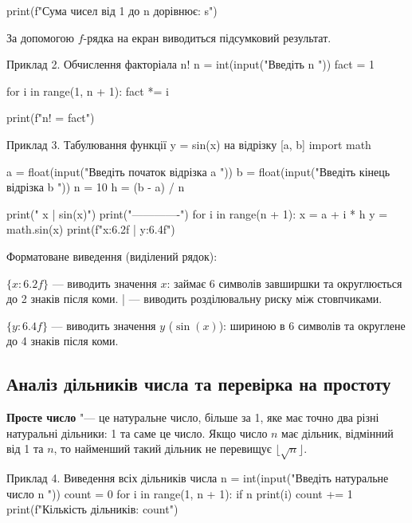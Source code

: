 print(f"Сума чисел від 1 до {n} дорівнює: {s}")

За допомогою $f$-рядка на екран виводиться підсумковий результат.
\begin{py}{Приклад 2. Обчислення факторіала n!}
n = int(input("Введіть n "))
fact = 1

for i in range(1, n + 1):
    fact *= i

print(f"{n}! = {fact}")
\end{py}

\begin{py}{Приклад 3. Табулювання функції y = sin(x) на відрізку [a, b]}
import math

a = float(input("Введіть початок відрізка a "))
b = float(input("Введіть кінець відрізка b "))
n = 10
h = (b - a) / n

print(" x | sin(x)")
print("-------------")
for i in range(n + 1):
    x = a + i * h
    y = math.sin(x)
    print(f"{x:6.2f} | {y:6.4f}")
\end{py}


Форматоване виведення (виділений рядок):

$\{x:6.2f\}$ — виводить значення $x$: займає 6 символів завширшки та округлюється до 2 знаків після коми. | — виводить розділювальну риску між стовпчиками.

$\{y:6.4f\}$ — виводить значення $y$ ($\sin(x)$): шириною в 6 символів та округлене до 4 знаків після коми.

\vspace{0.5cm}

\subsection*{ Аналіз дільників числа та перевірка на простоту}

\begin{tcolorbox}[colback=pyblue!5!white,colframe=pyblue,title=\textbf{Математична довідка},fonttitle=\sffamily\bfseries]
	\textbf{Просте число} "--- це натуральне число, більше за 1, яке має точно два різні натуральні дільники: 1 та саме це число. Якщо число $n$ має дільник, відмінний від 1 та $n$, то найменший такий дільник не перевищує $\lfloor\sqrt{n}\rfloor$.
\end{tcolorbox}

\begin{py}{Приклад 4. Виведення всіх дільників числа}
n = int(input("Введіть натуральне число n "))
count = 0
for i in range(1, n + 1):
    if n %
        print(i)
        count += 1
print(f"Кількість дільників: {count}")
\end{py}

